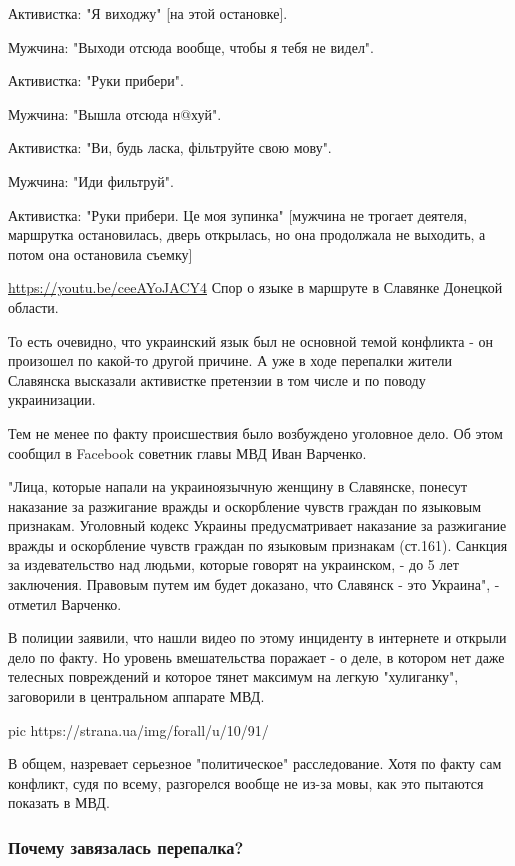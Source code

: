 Активистка: "Я виходжу" [на этой остановке]. 

Мужчина: "Выходи отсюда вообще, чтобы я тебя не видел". 

Активистка: "Руки прибери". 

Мужчина: "Вышла отсюда н@хуй". 

Активистка: "Ви, будь ласка, фільтруйте свою мову". 

Мужчина: "Иди фильтруй". 

Активистка: "Руки прибери. Це моя зупинка" [мужчина не трогает деятеля,
маршрутка остановилась, дверь открылась, но она продолжала не выходить, а потом
она остановила съемку]

\url{https://youtu.be/ceeAYoJACY4}
Спор о языке в маршруте в Славянке Донецкой области.

То есть очевидно, что украинский язык был не основной темой конфликта - он
произошел по какой-то другой причине. А уже в ходе перепалки жители Славянска
высказали активистке претензии в том числе и по поводу украинизации. 

Тем не менее по факту происшествия было возбуждено уголовное дело. Об этом
сообщил в Facebook советник главы МВД Иван Варченко.

"Лица, которые напали на украиноязычную женщину в Славянске, понесут наказание
за разжигание вражды и оскорбление чувств граждан по языковым признакам.
Уголовный кодекс Украины предусматривает наказание за разжигание вражды и
оскорбление чувств граждан по языковым признакам (ст.161). Санкция за
издевательство над людьми, которые говорят на украинском, - до 5 лет
заключения. Правовым путем им будет доказано, что Славянск - это Украина", -
отметил Варченко. 

В полиции заявили, что нашли видео по этому инциденту в интернете и открыли
дело по факту. Но уровень вмешательства поражает - о деле, в котором нет даже
телесных повреждений и которое тянет максимум на легкую "хулиганку", заговорили
в центральном аппарате МВД.

\ifcmt
pic https://strana.ua/img/forall/u/10/91/%
\fi

В общем, назревает серьезное "политическое" расследование. Хотя по факту сам
конфликт, судя по всему, разгорелся вообще не из-за мовы, как это пытаются
показать в МВД. 

\subsubsection{Почему завязалась перепалка?}

